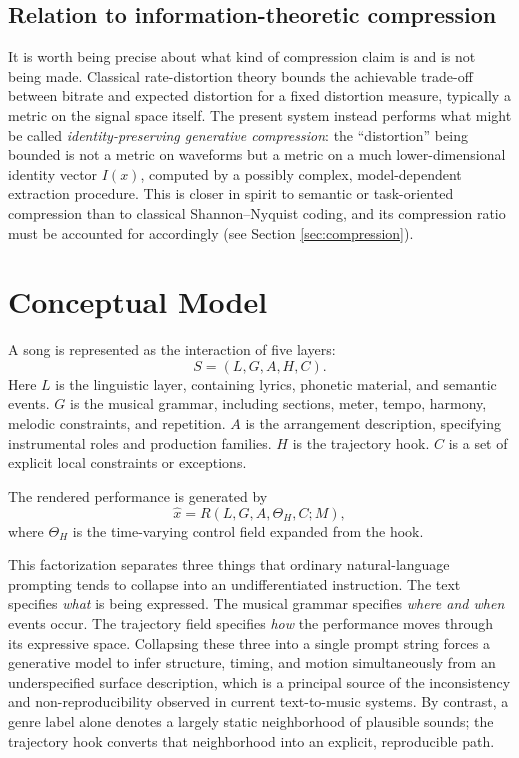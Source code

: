 \documentclass[11pt]{article}
\begin{document}
\subsection{Relation to information-theoretic compression}

It is worth being precise about what kind of compression claim is and is not being made. Classical rate-distortion theory bounds the achievable trade-off between bitrate and expected distortion for a fixed distortion measure, typically a metric on the signal space itself. The present system instead performs what might be called \emph{identity-preserving generative compression}: the ``distortion'' being bounded is not a metric on waveforms but a metric on a much lower-dimensional identity vector $I(x)$, computed by a possibly complex, model-dependent extraction procedure. This is closer in spirit to semantic or task-oriented compression than to classical Shannon--Nyquist coding, and its compression ratio must be accounted for accordingly (see Section \ref{sec:compression}).

\section{Conceptual Model}

A song is represented as the interaction of five layers:
\[
S=(L,G,A,H,C).
\]
Here $L$ is the linguistic layer, containing lyrics, phonetic material, and semantic events. $G$ is the musical grammar, including sections, meter, tempo, harmony, melodic constraints, and repetition. $A$ is the arrangement description, specifying instrumental roles and production families. $H$ is the trajectory hook. $C$ is a set of explicit local constraints or exceptions.

The rendered performance is generated by
\[
\hat{x}=R(L,G,A,\Theta_H,C;M),
\]
where $\Theta_H$ is the time-varying control field expanded from the hook.

This factorization separates three things that ordinary natural-language prompting tends to collapse into an undifferentiated instruction. The text specifies \emph{what} is being expressed. The musical grammar specifies \emph{where and when} events occur. The trajectory field specifies \emph{how} the performance moves through its expressive space. Collapsing these three into a single prompt string forces a generative model to infer structure, timing, and motion simultaneously from an underspecified surface description, which is a principal source of the inconsistency and non-reproducibility observed in current text-to-music systems. By contrast, a genre label alone denotes a largely static neighborhood of plausible sounds; the trajectory hook converts that neighborhood into an explicit, reproducible path.
\end{document}
